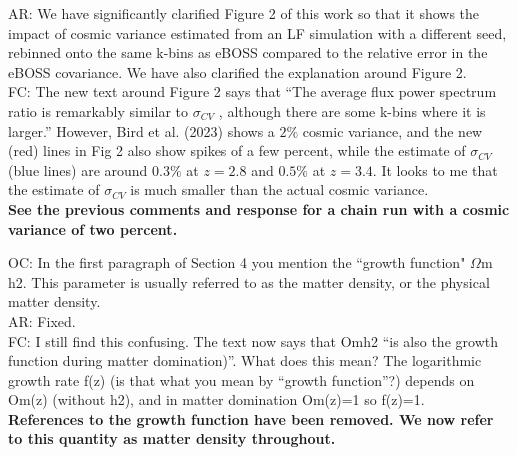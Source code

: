 \documentclass[12pt]{article}
\begin{document}
AR: We have significantly clarified Figure 2 of this work so that it shows the impact of cosmic variance estimated from an LF simulation with a different seed, rebinned onto the same k-bins as eBOSS compared to the relative error in the eBOSS covariance. We have also clarified the explanation around Figure 2.\\

FC: The new text around Figure 2 says that “The average flux power spectrum ratio is remarkably similar to $\sigma_{CV}$ , although there are some k-bins where it is larger.” However, Bird et al. (2023) shows a $2\%$ cosmic variance, and the new (red) lines in Fig 2 also show spikes of a few percent, while the estimate of $\sigma_{CV}$ (blue lines) are around $0.3\%$ at $z=2.8$ and $0.5\%$ at $z=3.4$. It looks to me that the estimate of $\sigma_{CV}$ is much smaller than the actual cosmic variance.\\

\textbf{See the previous comments and response for a chain run with a cosmic variance of two percent.}\\

\hrulefill \newline

OC: In the first paragraph of Section 4 you mention the “growth function" $\Omega$m h2. This parameter is usually referred to as the matter density, or the physical matter density.\\

AR: Fixed.\\

FC: I still find this confusing. The text now says that Omh2 “is also the growth function during matter domination)”. What does this mean? The logarithmic growth rate f(z) (is that what you mean by “growth function”?) depends on Om(z) (without h2), and in matter domination Om(z)=1 so f(z)=1.\\

\textbf{References to the growth function have been removed. We now refer to this quantity as matter density throughout.}\\

\hrulefill \newline
\end{document}
